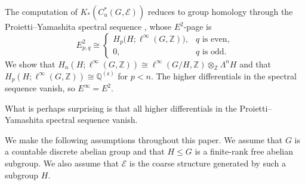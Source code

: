 \documentclass[pdflatex,sn-mathphys-num]{sn-jnl}%
\theoremstyle{plain}
\theoremstyle{remark}
\theoremstyle{definition}
\numberwithin{equation}{section}
\begin{document}
The computation of \( K_*(C_u^*(G,\mathcal E)) \) reduces to group homology through the Proietti--Yamashita spectral sequence \cite[Theorem~3.3]{proietti2022homology}, whose \( E^2 \)-page is
\[
E^2_{p,q}
\cong
\begin{cases}
H_p\bigl(H;\ell^\infty(G,\mathbb Z)\bigr),
& q \text{ is even},\\
0,
& q \text{ is odd}.
\end{cases}
\]
We show that \( H_n(H;\ell^\infty(G,\mathbb Z))\cong\ell^\infty(G/H,\mathbb Z)\otimes_{\mathbb Z}\Lambda^nH \) and that \( H_p(H;\ell^\infty(G,\mathbb Z))\cong\mathbb Q^{(\mathfrak c)} \) for \( p<n \). The higher differentials in the spectral sequence vanish, so \( E^\infty=E^2 \).


%

What is perhaps surprising is that all higher differentials in the Proietti--Yamashita spectral sequence vanish.

%
%
%
%

We make the following assumptions throughout this paper. We assume that \( G \) is a countable discrete abelian group and that \( H\leq G \) is a finite-rank free abelian subgroup. We also assume that \( \mathcal E \) is the coarse structure generated by such a subgroup \( H \).
\end{document}

